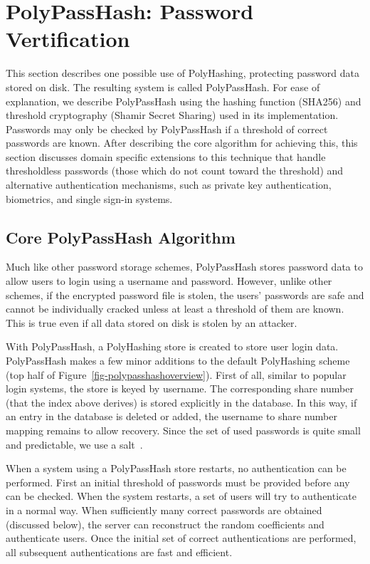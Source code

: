 

\section{PolyPassHash: Password Vertification}

This section describes one possible use of PolyHashing,
protecting password data stored on disk.   The resulting system is called
PolyPassHash.
For ease of explanation, we describe PolyPassHash using the hashing function
(SHA256) and threshold cryptography (Shamir Secret Sharing) used in its
implementation.
Passwords may only be checked by PolyPassHash if a threshold of correct
passwords are known.   After describing the core algorithm for achieving
this, this section discusses domain specific extensions to this technique
that handle thresholdless passwords (those which do not count toward
the threshold) and alternative authentication mechanisms, such
as private key authentication, biometrics, and single sign-in systems.



\subsection{Core PolyPassHash Algorithm}

Much like other password storage schemes, PolyPassHash stores password data 
to allow users to login using a username and password.   However, unlike 
other schemes, if the encrypted password file is stolen, the users' passwords
are safe and cannot be individually cracked unless at least a threshold
of them are known.   This is true even if all data stored on disk is stolen
by an attacker.

With PolyPassHash, a PolyHashing store is created to store user login data.
PolyPassHash makes a few minor additions to the default PolyHashing scheme
(top half of Figure~\ref{fig-polypasshashoverview}).   First of all, similar
to popular login systems, the store is keyed by username.   The corresponding
share number (that the index above derives) is stored explicitly in the 
database.   In this way, if an entry in the database is deleted or added, the
username to share number mapping remains to allow recovery.   Since
the set of used passwords is quite small and predictable, we use a 
salt~\cite{klein1990foiling}.

When a system using a PolyPassHash store restarts, no authentication can
be performed.   First an initial threshold of passwords must be provided
before any can be checked.   When the system restarts, a set of users 
will try to authenticate in a normal way.   
When
sufficiently many correct passwords are obtained (discussed below), the server 
can reconstruct the random coefficients and authenticate users.
Once the initial set of correct authentications are performed, all subsequent
authentications are fast and efficient.

